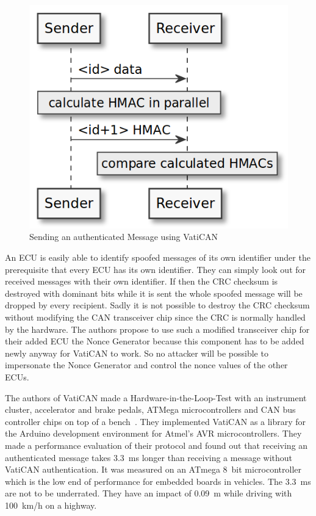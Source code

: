 \begin{figure}[h]
    \centering
    \captionsetup{justification=centering}
	\includegraphics[width=0.8\linewidth]{Figures/VatiCAN_sending_msg.png}
	\caption[]{Sending an authenticated Message using VatiCAN}
	\label{fig:vatican_sending_msg}
\end{figure}

An ECU is easily able to identify spoofed messages of its own identifier under
the prerequisite that every ECU has its own identifier. They can simply look out
for received messages with their own identifier. If then the CRC checksum is
destroyed with dominant bits while it is sent the whole spoofed message will be
dropped by every recipient. Sadly it is not possible to destroy the CRC checksum
without modifying the CAN transceiver chip since the CRC is normally handled by
the hardware. The authors propose to use such a modified transceiver chip for
their added ECU the Nonce Generator because this component has to be added newly
anyway for VatiCAN to work. So no attacker will be possible to impersonate the
Nonce Generator and control the nonce values of the other ECUs.

The authors of VatiCAN made a Hardware-in-the-Loop-Test with an instrument
cluster, accelerator and brake pedals, ATMega microcontrollers and CAN bus
controller chips on top of a bench~\cite{Nurnberger2016}. They implemented
VatiCAN as a library for the Arduino development environment for Atmel's AVR
microcontrollers. They made a performance evaluation of their protocol and found
out that receiving an authenticated message takes 3.3~ms longer than receiving a
message without VatiCAN authentication. It was measured on an ATmega 8~bit
microcontroller which is the low end of performance for embedded boards in
vehicles. The 3.3~ms are not to be underrated. They have an impact of 0.09~m
while driving with 100~km/h on a highway.

